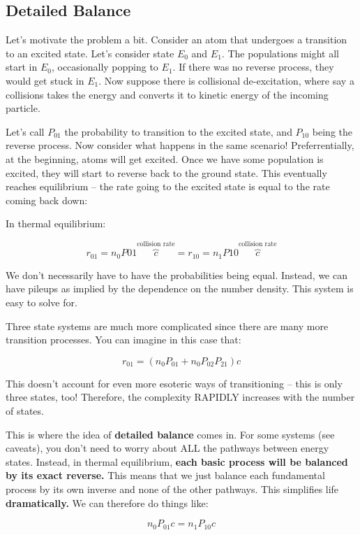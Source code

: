 \documentclass{article}
\begin{document}
\subsection{Detailed Balance}

Let's motivate the problem a bit. Consider an atom that undergoes a transition to an excited state. Let's consider state $E_0$ and $E_1$. The populations might all start in $E_0$, occasionally popping to $E_1$. If there was no reverse process, they would get stuck in $E_1$. Now suppose there is collisional de-excitation, where say a collisions takes the energy and converts it to kinetic energy of the incoming particle. 

Let's call $P_{01}$ the probability to transition to the excited state, and $P_{10}$ being the reverse process. Now consider what happens in the same scenario! Preferrentially, at the beginning, atoms will get excited. Once we have some population is excited, they will start to reverse back to the ground state. This eventually reaches equilibrium -- the rate going to the excited state is equal to the rate coming back down:

In thermal equilibrium:

$$
r_{01} = n_0 P{01} \overbrace{c}^\text{collision rate} = r_{10} =  n_1 P{10} \overbrace{c}^\text{collision rate}
$$

We don't necessarily have to have the probabilities being equal. Instead, we can have pileups as implied by the dependence on the number density. This system is easy to solve for. 

Three state systems are much more complicated since there are many more transition processes. You can imagine in this case that:

$$
r_{01} = \left(n_0 P_{01} + n_0 P_{02} P_{21}\right)c
$$

This doesn't account for even more esoteric ways of transitioning -- this is only three states, too! Therefore, the complexity RAPIDLY increases with the number of states. 

This is where the idea of \textbf{detailed balance} comes in. For some systems (see caveats), you don't need to worry about ALL the pathways between energy states. Instead, in thermal equilibrium, \textbf{each basic process will be balanced by its exact reverse.} This means that we just balance each fundamental process by its own inverse and none of the other pathways. This simplifies life \textbf{dramatically.} We can therefore do things like:

$$
n_0 P_{01} c = n_1 P_{10} c 
$$
\end{document}
